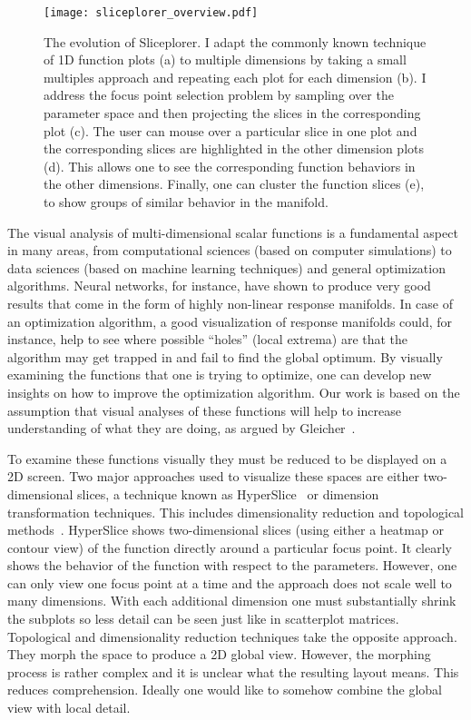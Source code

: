 


\begin{figure}[ht]
  \centering
  \texttt{[image: sliceplorer\_overview.pdf]}
  \caption[The evolution of Sliceplorer.]{%
    The evolution of Sliceplorer. I adapt the commonly known technique of
    1D function plots (a) to
    multiple dimensions by taking a small multiples approach and repeating each
    plot for each dimension (b). I address the
    focus point selection problem by sampling over the parameter space and then
    projecting the slices in the corresponding plot
    (c). The user can mouse over a particular
    slice in one plot and the corresponding slices are highlighted in the other
    dimension plots (d). This allows one to
    see the corresponding function behaviors in the other dimensions.  Finally,
    one can cluster the function slices (e), to
    show groups of similar behavior in the manifold.
  }
  \label{fig:walkthrough}
\end{figure}


The visual analysis of multi-dimensional scalar functions is a fundamental aspect in many areas, from computational sciences (based on computer simulations) to data sciences (based on machine learning techniques) and general optimization algorithms. 
Neural networks, for instance, have shown to produce very good results that come in the form of highly non-linear response manifolds.
In case of an optimization algorithm, a good visualization of response manifolds could, for instance, help to see where possible
``holes'' (local extrema) are that the algorithm may get trapped in and fail to find the
global optimum. By visually examining the functions that one is trying to
optimize, one can develop new insights on how to improve the optimization
algorithm. Our work is based on the assumption that visual analyses of these functions will help to increase
understanding of what they are doing, 
as argued by Gleicher~\cite{gleicher:2016}.

To examine these functions visually they must be reduced to be
displayed on a 2D screen. 
Two major approaches used to visualize these spaces are either
two-dimensional slices, a technique known as HyperSlice~\cite{Wijk:1993} or dimension transformation techniques. This includes dimensionality
reduction and topological methods~\cite{Correa:2011,Carr:2003a}.  HyperSlice
shows two-dimensional slices (using either a heatmap or contour view)
of the function directly around a particular focus point. It clearly shows the
behavior of the function with respect to the parameters. However, one can only
view one focus point at a time and 
the approach does not scale well to many dimensions.
With each additional dimension one must substantially 
shrink the subplots so less detail can be seen just like in scatterplot matrices. Topological and dimensionality
reduction techniques take the opposite approach. They morph the space to
produce a 2D global view. However, the morphing process is rather
complex and it is unclear what the resulting layout means. This reduces
comprehension. Ideally one would like to somehow combine the global view with
local detail.

